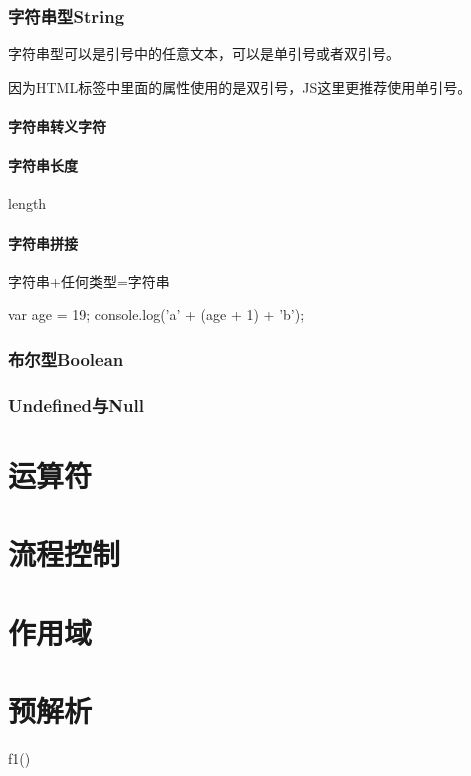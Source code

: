 \subsubsection{字符串型String}
字符串型可以是引号中的任意文本，可以是单引号或者双引号。

因为HTML标签中里面的属性使用的是双引号，JS这里更推荐使用单引号。
\paragraph{字符串转义字符}
\paragraph{字符串长度}
length
\paragraph{字符串拼接}
字符串+任何类型=字符串
\begin{js}
	var age = 19;
	console.log('a' + (age + 1) + 'b');
\end{js}

\subsubsection{布尔型Boolean}
\subsubsection{Undefined与Null}
\section{运算符}
\section{流程控制}

\section{作用域}

\section{预解析}

\begin{js}
	f1()
\end{js}



